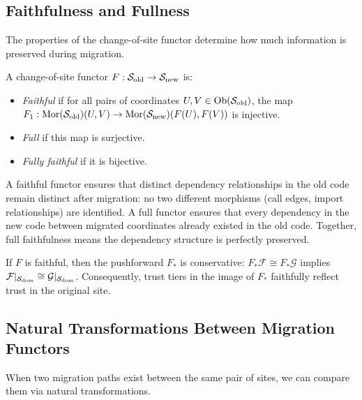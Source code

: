 \documentclass[11pt]{article}
\newcommand{\SiteOld}{\Site_{\mathrm{old}}}
\newcommand{\SiteNew}{\Site_{\mathrm{new}}}
\newcommand{\FunctorF}{F}
\newcommand{\Pushforward}{F_*}
\begin{document}
\subsection{Faithfulness and Fullness}\label{sec:faithful-full}

The properties of the change-of-site functor determine how much information
is preserved during migration.

\begin{definition}\label{def:faithful-full}
A change-of-site functor $\FunctorF : \SiteOld \to \SiteNew$ is:
\begin{itemize}[noitemsep]
  \item \emph{Faithful} if for all pairs of coordinates $U, V \in
        \Ob(\SiteOld)$, the map $\FunctorF_1 : \Mor(\SiteOld)(U,V) \to
        \Mor(\SiteNew)(\FunctorF(U), \FunctorF(V))$ is injective.
  \item \emph{Full} if this map is surjective.
  \item \emph{Fully faithful} if it is bijective.
\end{itemize}
\end{definition}

A faithful functor ensures that distinct dependency relationships in the
old code remain distinct after migration: no two different morphisms
(call edges, import relationships) are identified.  A full functor ensures
that every dependency in the new code between migrated coordinates already
existed in the old code.  Together, full faithfulness means the dependency
structure is perfectly preserved.

\begin{proposition}\label{prop:faithful-trust}
If $\FunctorF$ is faithful, then the pushforward $\Pushforward$ is
conservative: $\Pushforward\mathcal{F} \cong \Pushforward\mathcal{G}$
implies $\mathcal{F}|_{\mathcal{S}_{\mathrm{dom}}} \cong
\mathcal{G}|_{\mathcal{S}_{\mathrm{dom}}}$.  Consequently, trust tiers in the
image of $\Pushforward$ faithfully reflect trust in the original site.
\end{proposition}

\subsection{Natural Transformations Between Migration Functors}
\label{sec:nat-trans-migration}

When two migration paths exist between the same pair of sites, we can
compare them via natural transformations.
\end{document}
